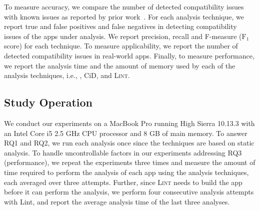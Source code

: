 
To measure accuracy, we compare the number of detected compatibility issues with known issues as reported by prior work~\cite{huang2018understanding,lili2018cid}. For each analysis technique, we report true and false positives and false
negatives in detecting compatibility issues of the apps under analysis. 
We report precision, recall and F-measure ($\text{F}_1$ score) for each technique.
To measure applicability, we report the number of detected
compatibility issues in real-world apps. Finally, to measure
performance, we report the analysis time and the amount of memory used by each of the analysis techniques, i.e., \@approach, {\sc CiD}, and \textsc{Lint}.



\subsection{Study Operation}

We conduct our experiments on a MacBook Pro running
High Sierra 10.13.3 with an Intel Core i5 2.5 GHz CPU
processor and 8 GB of main memory. To answer RQ1 and
RQ2, we run each analysis once since the techniques are
based on static analysis.  To handle uncontrollable
factors in our experiments addressing RQ3
(performance), we repeat the experiments three times
and measure the amount of time required to perform the
analysis of each app using the analysis techniques,
each averaged over three attempts. Further, since
\textsc{Lint} needs to build the app before it can
perform the analysis, we perform four consecutive
analysis attempts with {\sc Lint}, and report the
average analysis time of the last three analyses. 


